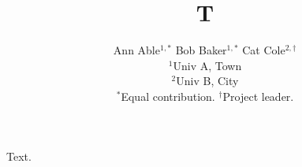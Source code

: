 \documentclass{article}
\begin{document}
\title{T}
\author{Ann Able$^{1,*}$ \quad Bob Baker$^{1,*}$ \quad Cat Cole$^{2,\dagger}$ \\
$^{1}$Univ A, Town \\
$^{2}$Univ B, City \\
$^{*}$Equal contribution. \qquad $^{\dagger}$Project leader.}
\maketitle
Text.
\end{document}
